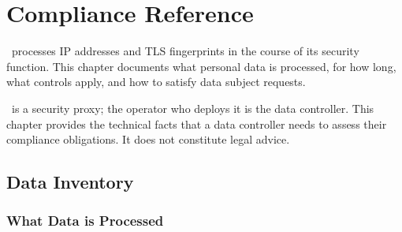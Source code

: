 
\chapter{Compliance Reference}
\label{ch:compliance}

\begin{chapterquote}
\ja\ processes IP addresses and TLS fingerprints in the course of its security
function. This chapter documents what personal data is processed, for how long,
what controls apply, and how to satisfy data subject requests.
\end{chapterquote}

 \ja\ is a
security proxy; the operator who deploys it is the data controller. This chapter
provides the technical facts that a data controller needs to assess their compliance
obligations. It does not constitute legal advice.

\section{Data Inventory}

\subsection{What Data is Processed}


